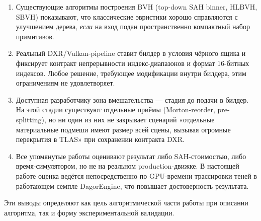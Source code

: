 \begin{enumerate}
    \item Существующие алгоритмы построения BVH (top-down
      SAH binner, HLBVH, SBVH) показывают, что классические
      эвристики хорошо справляются с улучшением дерева,
      \emph{если} на вход подан пространственно компактный
      набор примитивов.
    \item Реальный DXR/Vulkan-pipeline ставит билдер в условия
      чёрного ящика и фиксирует контракт непрерывности
      индекс-диапазонов и формат 16-битных индексов. Любое
      решение, требующее модификации внутри билдера, этим
      ограничениям не удовлетворяет.
    \item Доступная разработчику зона вмешательства --- стадия до
      подачи в билдер. На этой стадии существуют отдельные приёмы
      (Morton-reorder, pre-splitting), но ни один из них не
      закрывает сценарий «отдельные материальные подмеши имеют размер всей сцены, вызывая огромные перекрытия в TLAS» при
      сохранении контракта DXR.
    \item Все упомянутые работы оценивают результат либо
      SAH-стоимостью, либо время-симулятором, но не на реальном
      production-движке. В настоящей работе оценка ведётся
      непосредственно по GPU-времени трассировки теней в
      работающем семпле DagorEngine, что повышает достоверность
      результата.
\end{enumerate}

Эти выводы определяют как цель алгоритмической части работы
при описании алгоритма, так и форму экспериментальной
валидации.
